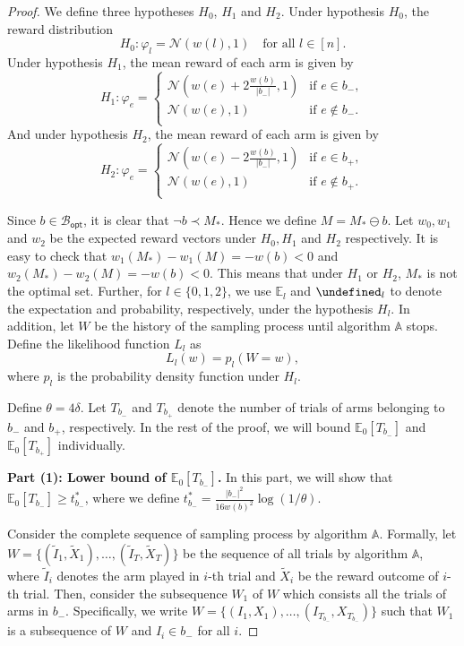 \documentclass{article}
\newcommand{\Rew}{\varphi}
\newcommand{\E}{\mathbb E}
\newcommand{\diffvalid}{\prec}
\newcommand{\Bopt}{\mathcal B_{\mathsf{opt}}}
\let\Pr\undefined
\DeclareMathOperator{\Pr}{Pr}
\begin{document}
\begin{spacing}{1.1}
\begin{proof}
We define three hypotheses $H_0$, $H_1$ and $H_2$. 
Under hypothesis $H_0$, the reward distribution 
$$
H_0: \Rew_l = \mathcal N(w(l),1) \quad \text{for all } l \in [n].
$$
Under hypothesis $H_1$, the mean reward of each arm is given by 
$$
H_1: \Rew_e = \begin{cases}
	\mathcal N\left(w(e)+2\frac{w(b)}{|b_-|},1\right) & \text{if } e\in b_-,\\
	\mathcal N(w(e), 1) & \text{if } e\not\in b_-.\\
    \end{cases}
$$
And under hypothesis $H_2$, the mean reward of each arm is given by 
$$
H_2: \Rew_e = \begin{cases}
	\mathcal N\left(w(e)-2\frac{w(b)}{|b_-|},1\right)  & \text{if } e\in b_+,\\
	\mathcal N(w(e), 1)  & \text{if } e\not\in b_+.\\
    \end{cases}
$$

Since $b\in \Bopt$, it is clear that $\neg b \diffvalid M_*$. Hence we define $M = M_* \ominus b$.
Let $w_0, w_1$ and $w_2$ be the expected reward vectors under $H_0,H_1$ and $H_2$ respectively.
It is easy to check that 
$w_1(M_*)-w_1(M) = -w(b) < 0$ and
$w_2(M_*)-w_2(M) = -w(b) < 0$.
This means that under $H_1$ or $H_2$, $M_*$ is not the optimal set.
Further, for $l\in \{0,1,2\}$, we use $\E_l$ and $\Pr_l$ to denote the expectation and probability, respectively, under the hypothesis $H_l$.
In addition, let $W$ be the history of the sampling process until algorithm $\mathbb A$ stops.
Define the likelihood function $L_l$ as 
$$
L_l(w) = p_l(W=w),
$$
where $p_l$ is the probability density function under $H_l$.


Define $\theta=4\delta$.
Let $T_{b_-}$ and $T_{b_+}$ denote the number of trials of arms belonging to $b_-$ and $b_+$, respectively. 
In the rest of the proof, we will bound $\E_0[T_{b_-}]$ and $\E_0[T_{b_+}]$ individually.



\textbf{Part (1): Lower bound of $\E_0[T_{b_-}]$.}
In this part, we will show that $\E_0[T_{b_-}]\ge t_{b_-}^*$, where we define $t_{b_-}^* = \frac{|b_-|^2}{16 w(b)^2}\log(1/\theta)$.

Consider the complete sequence of sampling process by algorithm $\mathbb A$.
Formally, let $W=\{(\tilde I_1,\tilde X_1),\ldots, (\tilde I_T, \tilde X_T)\}$ be the sequence of all trials by algorithm $\mathbb A$, where $\tilde I_i$ denotes the arm played in $i$-th trial and $\tilde X_i$ be the reward outcome of $i$-th trial.
Then, consider the subsequence $W_1$ of $W$ which consists all the trials of arms in $b_-$.
Specifically, we write $W=\{(I_1,X_1),\ldots,(I_{T_{b_-}}, X_{T_{b_-}})\}$ such that $W_1$ is a subsequence of $W$ and $I_i \in b_-$ for all $i$.


\end{proof}
\end{spacing}
\end{document}
